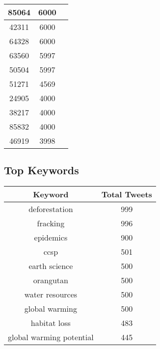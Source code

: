 \documentclass{article}\usepackage[T1]{fontenc}
\begin{document}
\begin{tabular}{|c|c|c|}
 \hline
85064 & 6000\\ 
 \hline
42311 & 6000\\ 
 \hline
64328 & 6000\\ 
 \hline
63560 & 5997\\ 
 \hline
50504 & 5997\\ 
 \hline
51271 & 4569\\ 
 \hline
24905 & 4000\\ 
 \hline
38217 & 4000\\ 
 \hline
85832 & 4000\\ 
 \hline
46919 & 3998\\ 
 \hline
\end{tabular}\subsection*{Top Keywords}\begin{tabular}{|c|c|}         \hline         Keyword & Total Tweets \\ 
 \hline
deforestation & 999\\ 
 \hline
fracking & 996\\ 
 \hline
epidemics & 900\\ 
 \hline
ccsp & 501\\ 
 \hline
earth science & 500\\ 
 \hline
orangutan & 500\\ 
 \hline
water resources & 500\\ 
 \hline
global warming & 500\\ 
 \hline
habitat loss & 483\\ 
 \hline
global warming potential & 445\\ 
 \hline
\end{tabular}
\end{document}
